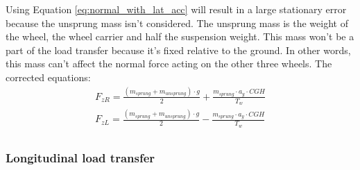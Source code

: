 Using Equation \ref{eq:normal_with_lat_acc} will result in a large stationary error because the unsprung mass isn't considered. The unsprung mass is the weight of the wheel, the wheel carrier and half the suspension weight. This mass won't be a part of the load transfer because it's fixed relative to the ground. In other words, this mass can't affect the normal force acting on the other three wheels. The corrected equations:
\begin{equation} \label{eq:normal_with_lat_acc_unsprung}
\begin{split}
F_{zR} = \frac{(m_{sprung}+m_{unsprung})\cdot g}{2} + \frac{m_{sprung}\cdot a_{y}\cdot CGH}{T_{w}} \\
F_{zL} = \frac{(m_{sprung}+m_{unsprung})\cdot g}{2} - \frac{m_{sprung}\cdot a_{y}\cdot CGH}{T_{w}} \\
\end{split}
\end{equation}

\subsubsection{Longitudinal load transfer}

